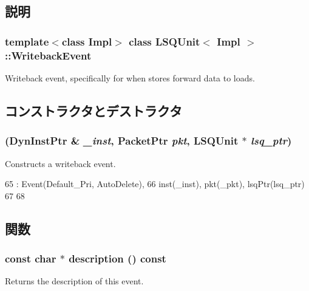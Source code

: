 \subsection{説明}
\subsubsection*{template$<$class Impl$>$ class LSQUnit$<$ Impl $>$::WritebackEvent}

Writeback event, specifically for when stores forward data to loads. 

\subsection{コンストラクタとデストラクタ}
\hypertarget{classLSQUnit_1_1WritebackEvent_ad1942b2a87a89eb815770af265c702f9}{
\subsubsection[{WritebackEvent}]{ ({\bf DynInstPtr} \& {\em \_\-inst}, \/  {\bf PacketPtr} {\em pkt}, \/  {\bf LSQUnit} $\ast$ {\em lsq\_\-ptr})}}
\label{classLSQUnit_1_1WritebackEvent_ad1942b2a87a89eb815770af265c702f9}
Constructs a writeback event. 


\begin{DoxyCode}
65     : Event(Default_Pri, AutoDelete),
66       inst(_inst), pkt(_pkt), lsqPtr(lsq_ptr)
67 {
68 }
\end{DoxyCode}


\subsection{関数}
\hypertarget{classLSQUnit_1_1WritebackEvent_a5a14fe478e2393ff51f02e9b7be27e00}{
\subsubsection[{description}]{\setlength{\rightskip}{0pt plus 5cm}const char $\ast$ description () const}}
\label{classLSQUnit_1_1WritebackEvent_a5a14fe478e2393ff51f02e9b7be27e00}
Returns the description of this event. 

